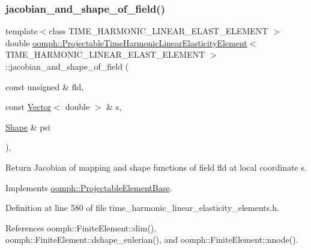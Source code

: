 \subsubsection{\texorpdfstring{jacobian\+\_\+and\+\_\+shape\+\_\+of\+\_\+field()}{jacobian\_and\_shape\_of\_field()}}
{\footnotesize\ttfamily template$<$class T\+I\+M\+E\+\_\+\+H\+A\+R\+M\+O\+N\+I\+C\+\_\+\+L\+I\+N\+E\+A\+R\+\_\+\+E\+L\+A\+S\+T\+\_\+\+E\+L\+E\+M\+E\+NT $>$ \\
double \hyperlink{classoomph_1_1ProjectableTimeHarmonicLinearElasticityElement}{oomph\+::\+Projectable\+Time\+Harmonic\+Linear\+Elasticity\+Element}$<$ T\+I\+M\+E\+\_\+\+H\+A\+R\+M\+O\+N\+I\+C\+\_\+\+L\+I\+N\+E\+A\+R\+\_\+\+E\+L\+A\+S\+T\+\_\+\+E\+L\+E\+M\+E\+NT $>$\+::jacobian\+\_\+and\+\_\+shape\+\_\+of\+\_\+field (\begin{DoxyParamCaption}\item[{const unsigned \&}]{fld,  }\item[{const \hyperlink{classoomph_1_1Vector}{Vector}$<$ double $>$ \&}]{s,  }\item[{\hyperlink{classoomph_1_1Shape}{Shape} \&}]{psi }\end{DoxyParamCaption})\hspace{0.3cm}{\ttfamily [inline]}, {\ttfamily [virtual]}}



Return Jacobian of mapping and shape functions of field fld at local coordinate s. 



Implements \hyperlink{classoomph_1_1ProjectableElementBase_ad45c21b58c0985d52f68ab2d79cbb488}{oomph\+::\+Projectable\+Element\+Base}.



Definition at line 580 of file time\+\_\+harmonic\+\_\+linear\+\_\+elasticity\+\_\+elements.\+h.



References oomph\+::\+Finite\+Element\+::dim(), oomph\+::\+Finite\+Element\+::dshape\+\_\+eulerian(), and oomph\+::\+Finite\+Element\+::nnode().

\mbox{\label{classoomph_1_1ProjectableTimeHarmonicLinearElasticityElement_a773b3f4a6cf431ca3a95248f6f9766e6}} 
